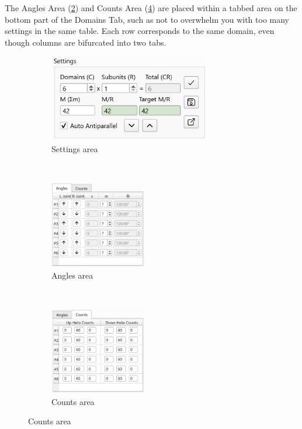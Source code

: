 \documentclass[titlepage]{article}
\begin{document}
The Angles Area (\ref{fig:domains-tab-table-angles}) and Counts Area (\ref{fig:domains-tab-table-counts}) are placed within a tabbed area on the bottom part of the Domains Tab, such as not to overwhelm you with too many settings in the same table. Each row corresponds to the same domain, even though columns are bifurcated into two tabs.

\begin{figure}
	\label{fig:domains-tab-components}
	\caption{Domains Subpanel Components}
	\centering
	\begin{subfigure}{.45\linewidth}
		\centering
		\label{fig:domains-tab-settings-area}
		\includegraphics[height=1.5in]{domains-tab-settings-area.png}
		\caption{Settings area}
	\end{subfigure}%
	~
	\begin{subfigure}{.3\linewidth}
		\centering
		\label{fig:domains-tab-table-angles}
		\includegraphics[height=1.5in]{domains-tab-table-angles.png}
		\caption{Angles area}
	\end{subfigure}%
	~
	\begin{subfigure}{.3\linewidth}
		\centering
		\label{fig:domains-tab-table-counts}
		\includegraphics[height=1.5in]{domains-tab-table-counts.png}
		\caption{Counts area}
	\end{subfigure}
\end{figure}
\end{document}
